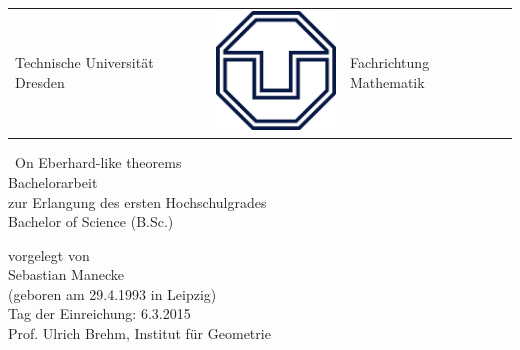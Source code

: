 \begin{titlepage}
\begin{center}


  \begin{tabular}{R{6.9cm} M p{6.9cm}}
    {\Large Technische Universität Dresden}&  \includegraphics[scale =0.25]{TU.png} & \Large{Fachrichtung Mathematik}     
  \end{tabular}

  \vfil

  {\Huge\ On Eberhard-like theorems}
  \\[\bigskipamount]
  \vfil
      {\LARGE
        Bachelorarbeit
        \\[\bigskipamount]
        zur Erlangung des ersten Hochschulgrades
        \\[\bigskipamount]
        Bachelor of Science  (B.Sc.)
        \\[\bigskipamount]
      }




      vorgelegt von
      \\[\bigskipamount]
      Sebastian Manecke
      \\[\bigskipamount]
      (geboren am 29.4.1993 in Leipzig)
      \\[\bigskipamount]
      Tag der Einreichung: 6.3.2015
      \\[\bigskipamount]
      Prof. Ulrich Brehm, Institut für Geometrie
\end{center}
\end{titlepage}

